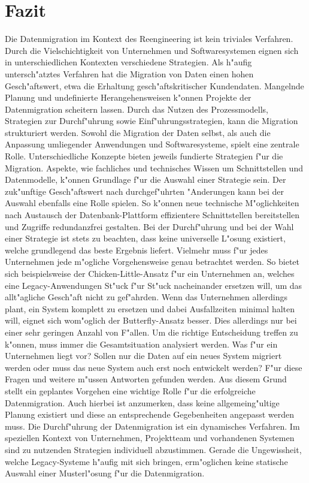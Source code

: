 \section{Fazit}
\label{chapter:fazit}

Die Datenmigration im Kontext des Reengineering ist kein triviales Verfahren. Durch die Vielschichtigkeit von Unternehmen und Softwaresystemen eignen sich in unterschiedlichen Kontexten verschiedene Strategien. Als h"aufig untersch"atztes Verfahren hat die Migration von Daten einen hohen Gesch"aftswert, etwa die Erhaltung gesch"aftskritischer Kundendaten. Mangelnde Planung und undefinierte Herangehensweisen k"onnen Projekte der Datenmigration scheitern lassen. Durch das Nutzen des Prozessmodells, Strategien zur Durchf"uhrung sowie Einf"uhrungsstrategien, kann die Migration strukturiert werden.
\lb
Sowohl die Migration der Daten selbst, als auch die Anpassung umliegender Anwendungen und Softwaresysteme, spielt eine zentrale Rolle. Unterschiedliche Konzepte bieten jeweils fundierte Strategien f"ur die Migration. Aspekte, wie fachliches und technisches Wissen um Schnittstellen und Datenmodelle, k"onnen Grundlage f"ur die Auswahl einer Strategie sein. Der zuk"unftige Gesch"aftswert nach durchgef"uhrten "Anderungen kann bei der Auswahl ebenfalls eine Rolle spielen. So k"onnen neue technische M"oglichkeiten nach Austausch der Datenbank-Plattform effizientere Schnittstellen bereitstellen und Zugriffe redundanzfrei gestalten.
\lb
Bei der Durchf"uhrung und bei der Wahl einer Strategie ist stets zu beachten, dass keine universelle L"osung existiert, welche grundlegend das beste Ergebnis liefert. Vielmehr muss f"ur jedes Unternehmen jede m"ogliche Vorgehensweise genau betrachtet werden. So bietet sich beispielsweise der Chicken-Little-Ansatz f"ur ein Unternehmen an, welches eine Legacy-Anwendungen St"uck f"ur St"uck nacheinander ersetzen will, um das allt"agliche Gesch"aft nicht zu gef"ahrden. Wenn das Unternehmen allerdings plant, ein System komplett zu ersetzen und dabei Ausfallzeiten minimal halten will, eignet sich wom"oglich der Butterfly-Ansatz besser. Dies allerdings nur bei einer sehr geringen Anzahl von F"allen.
\lb
Um die richtige Entscheidung treffen zu k"onnen, muss immer die Gesamtsituation analysiert werden. Was f"ur ein Unternehmen liegt vor? Sollen nur die Daten auf ein neues System migriert werden oder muss das neue System auch erst noch entwickelt werden? F"ur diese Fragen und weitere m"ussen Antworten gefunden werden. Aus diesem Grund stellt ein geplantes Vorgehen eine wichtige Rolle f"ur die erfolgreiche Datenmigration. Auch hierbei ist anzumerken, dass keine allgemeing"ultige Planung existiert und diese an entsprechende Gegebenheiten angepasst werden muss. 
\lb
Die Durchf"uhrung der Datenmigration ist ein dynamisches Verfahren. Im speziellen Kontext von Unternehmen, Projektteam und vorhandenen Systemen sind zu nutzenden Strategien individuell abzustimmen. Gerade die Ungewissheit, welche Legacy-Systeme h"aufig mit sich bringen, erm"oglichen keine statische Auswahl einer Musterl"osung f"ur die Datenmigration.